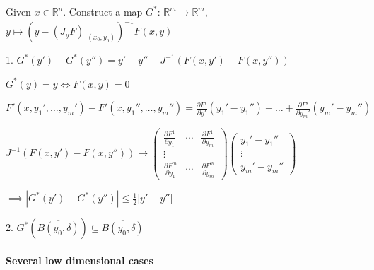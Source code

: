 \begin{pf}
    Given $x\in\mathbb{R}^n$. Construct a map $G^*:\,\mathbb{R}^m\to\mathbb{R}^m$, $y\mapsto (y-(J_yF)|_{(x_0,y_0)})^{-1}F(x,y)$

    1. $G^*(y')-G^*(y'')=y'-y''-J^{-1}(F(x,y')-F(x,y''))$

    $G^*(y)=y\iff F(x,y)=0$

    $F'(x,y_1',\dots,y_m')-F'(x,y_1'',\dots,y_m'')=\frac{\partial F'}{\partial y'}(y_1'-y_1'')+\dots+\frac{\partial F'}{\partial y_m'}(y_m'-y_m'')$

    $J^{-1}(F(x,y')-F(x,y''))\rightarrow\begin{pmatrix}
            \frac{\partial F^1}{\partial y_1} & \cdots & \frac{\partial F^1}{\partial y_m} \\
            \vdots                            &        &                                   \\
            \frac{\partial F^m}{\partial y_1} & \cdots & \frac{\partial F^m}{\partial y_m}
        \end{pmatrix}\begin{pmatrix}
            y_1'-y_1'' \\
            \vdots     \\
            y_m'-y_m''
        \end{pmatrix}$

    $\implies|G^*(y')-G^*(y'')|\leq\frac{1}{2}|y'-y''|$

    2. $G^*(\overline{B(y_0,\delta)})\subseteq\overline{B(y_0,\delta)}$
\end{pf}


\paragraph*{Several low dimensional cases}

